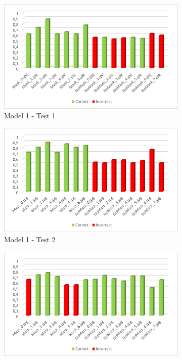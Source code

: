 \documentclass[a4paper,12pt]{article}
\begin{document}
\begin{figure}%
    \centering
    \begin{subfigure}{6cm}
        \includegraphics[width=\linewidth]{images_latex/test1_1.png}
        \caption{Model 1 - Test 1}
    \end{subfigure}
    \qquad
    \begin{subfigure}{6cm}
        \includegraphics[width=\linewidth]{images_latex/test1_2.png}
        \caption{ Model 1 - Test 2}
    \end{subfigure}
    \qquad
    \begin{subfigure}{6cm}
        \includegraphics[width=\linewidth]{images_latex/test1_3.png}

\end{subfigure}
\end{figure}
\end{document}
